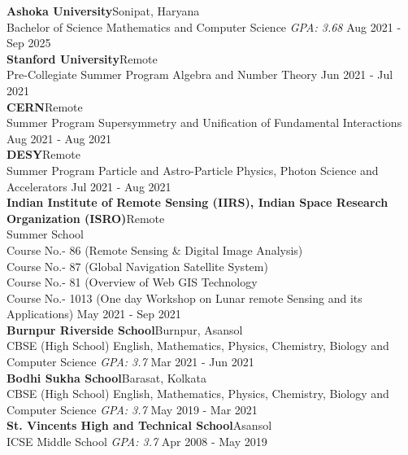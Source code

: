 \documentclass[a4paper]{article}
\begin{document}
\textbf{Ashoka University}\hfill Sonipat, Haryana\\
Bachelor of Science Mathematics and Computer Science \textit{GPA: 3.68} \hfill Aug 2021 - Sep 2025\\
\vspace{2.5mm}
\textbf{Stanford University}\hfill Remote\\
Pre-Collegiate Summer Program Algebra and Number Theory \hfill Jun 2021 - Jul 2021\\
\vspace{2.5mm}
\textbf{CERN}\hfill Remote\\
Summer Program Supersymmetry and Unification of Fundamental Interactions \hfill Aug 2021 - Aug 2021\\
\vspace{2.5mm}
\textbf{DESY}\hfill Remote\\
Summer Program Particle and Astro-Particle Physics, Photon Science and Accelerators \hfill Jul 2021 - Aug 2021\\
\vspace{2.5mm}
\textbf{Indian Institute of Remote Sensing (IIRS), Indian Space Research Organization (ISRO)}\hfill Remote\\
Summer School \\ Course No.- 86 (Remote Sensing \& Digital Image Analysis) \\ Course No.- 87 (Global Navigation Satellite System) \\ Course No.- 81 (Overview of Web GIS Technology \\ Course No.- 1013 (One day Workshop on Lunar remote Sensing and its Applications) \hfill May 2021 - Sep 2021\\
\vspace{2.5mm}
\textbf{Burnpur Riverside School}\hfill Burnpur, Asansol\\
CBSE (High School) English, Mathematics, Physics, Chemistry, Biology and Computer Science \textit{GPA: 3.7} \hfill Mar 2021 - Jun 2021\\
\vspace{2.5mm}
\textbf{Bodhi Sukha School}\hfill Barasat, Kolkata\\
CBSE (High School) English, Mathematics, Physics, Chemistry, Biology and Computer Science \textit{GPA: 3.7} \hfill May 2019 - Mar 2021\\
\vspace{2.5mm}
\textbf{St. Vincent\textquotesingle{}s High and Technical School}\hfill Asansol\\
ICSE Middle School \textit{GPA: 3.7} \hfill Apr 2008 - May 2019\\
\vspace{4mm}
\end{document}
